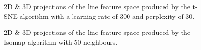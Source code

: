 \clearpage
\begin{figure}[H]
	\centering
	\caption{2D \& 3D projections of the line feature space produced by the t-SNE algorithm with a learning rate of 300 and perplexity of 30.}\label{fig:line_SNE_mapping}
\end{figure}

\begin{figure}[H]
	\centering
	\caption{2D \& 3D projections of the line feature space  produced by the Isomap algorithm with 50 neighbours.}\label{fig:line_iso_mapping}
\end{figure}

